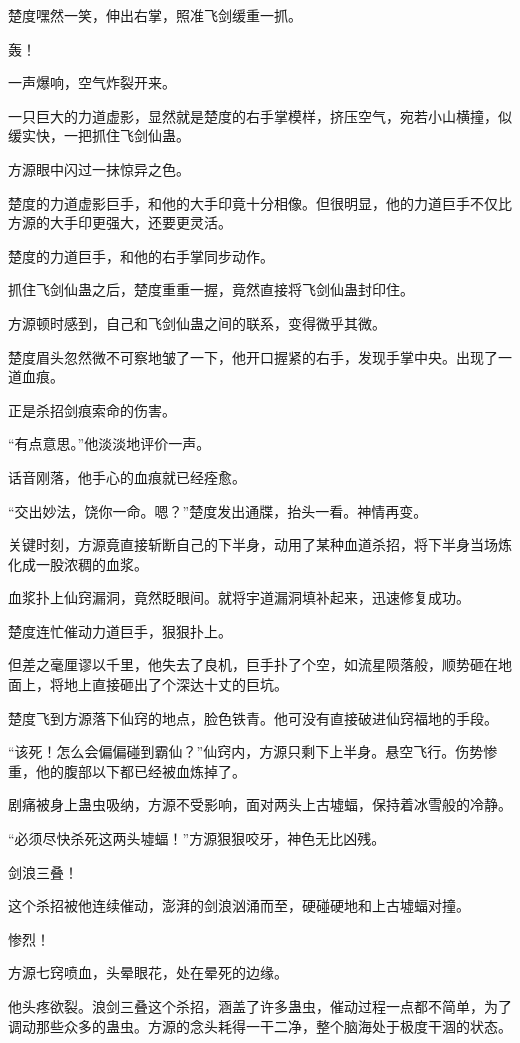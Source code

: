 \begin{this_body}
楚度嘿然一笑，伸出右掌，照准飞剑缓重一抓。

轰！

一声爆响，空气炸裂开来。

一只巨大的力道虚影，显然就是楚度的右手掌模样，挤压空气，宛若小山横撞，似缓实快，一把抓住飞剑仙蛊。

方源眼中闪过一抹惊异之色。

楚度的力道虚影巨手，和他的大手印竟十分相像。但很明显，他的力道巨手不仅比方源的大手印更强大，还要更灵活。

楚度的力道巨手，和他的右手掌同步动作。

抓住飞剑仙蛊之后，楚度重重一握，竟然直接将飞剑仙蛊封印住。

方源顿时感到，自己和飞剑仙蛊之间的联系，变得微乎其微。

楚度眉头忽然微不可察地皱了一下，他开口握紧的右手，发现手掌中央。出现了一道血痕。

正是杀招剑痕索命的伤害。

“有点意思。”他淡淡地评价一声。

话音刚落，他手心的血痕就已经痊愈。

“交出妙法，饶你一命。嗯？”楚度发出通牒，抬头一看。神情再变。

关键时刻，方源竟直接斩断自己的下半身，动用了某种血道杀招，将下半身当场炼化成一股浓稠的血浆。

血浆扑上仙窍漏洞，竟然眨眼间。就将宇道漏洞填补起来，迅速修复成功。

楚度连忙催动力道巨手，狠狠扑上。

但差之毫厘谬以千里，他失去了良机，巨手扑了个空，如流星陨落般，顺势砸在地面上，将地上直接砸出了个深达十丈的巨坑。

楚度飞到方源落下仙窍的地点，脸色铁青。他可没有直接破进仙窍福地的手段。

“该死！怎么会偏偏碰到霸仙？”仙窍内，方源只剩下上半身。悬空飞行。伤势惨重，他的腹部以下都已经被血炼掉了。

剧痛被身上蛊虫吸纳，方源不受影响，面对两头上古墟蝠，保持着冰雪般的冷静。

“必须尽快杀死这两头墟蝠！”方源狠狠咬牙，神色无比凶残。

剑浪三叠！

这个杀招被他连续催动，澎湃的剑浪汹涌而至，硬碰硬地和上古墟蝠对撞。

惨烈！

方源七窍喷血，头晕眼花，处在晕死的边缘。

他头疼欲裂。浪剑三叠这个杀招，涵盖了许多蛊虫，催动过程一点都不简单，为了调动那些众多的蛊虫。方源的念头耗得一干二净，整个脑海处于极度干涸的状态。


\end{this_body}
